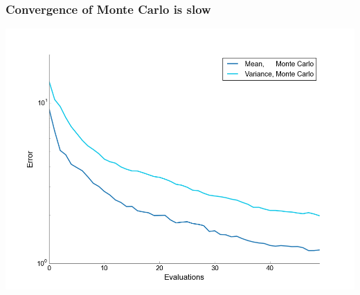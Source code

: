 \documentclass[handout]{beamer}
\newcommand{\E}[1]{\mbox{E}\!\left(#1\right)}
\newcommand{\Var}[1]{\mbox{Var}\!\left(#1\right)}
\begin{document}
\begin{frame}
  \frametitle{Convergence of Monte Carlo is slow}
  \begin{center}
    \includegraphics[width=1\textwidth]{MC_convergence_2D.png}
  \end{center}
\end{frame}


\end{document}
